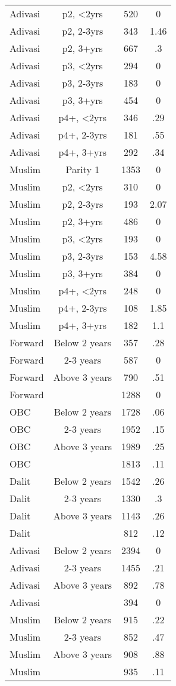 \begin{tabular}{lccc}
Adivasi&p2, <2yrs&520&0\\
Adivasi&p2, 2-3yrs&343&1.46\\
Adivasi&p2, 3+yrs&667&.3\\
Adivasi&p3, <2yrs&294&0\\
Adivasi&p3, 2-3yrs&183&0\\
Adivasi&p3, 3+yrs&454&0\\
Adivasi&p4+, <2yrs&346&.29\\
Adivasi&p4+, 2-3yrs&181&.55\\
Adivasi&p4+, 3+yrs&292&.34\\
Muslim&Parity 1&1353&0\\
Muslim&p2, <2yrs&310&0\\
Muslim&p2, 2-3yrs&193&2.07\\
Muslim&p2, 3+yrs&486&0\\
Muslim&p3, <2yrs&193&0\\
Muslim&p3, 2-3yrs&153&4.58\\
Muslim&p3, 3+yrs&384&0\\
Muslim&p4+, <2yrs&248&0\\
Muslim&p4+, 2-3yrs&108&1.85\\
Muslim&p4+, 3+yrs&182&1.1\\
Forward&Below 2 years&357&.28\\
Forward&2-3 years&587&0\\
Forward&Above 3 years&790&.51\\
Forward&&1288&0\\
OBC&Below 2 years&1728&.06\\
OBC&2-3 years&1952&.15\\
OBC&Above 3 years&1989&.25\\
OBC&&1813&.11\\
Dalit&Below 2 years&1542&.26\\
Dalit&2-3 years&1330&.3\\
Dalit&Above 3 years&1143&.26\\
Dalit&&812&.12\\
Adivasi&Below 2 years&2394&0\\
Adivasi&2-3 years&1455&.21\\
Adivasi&Above 3 years&892&.78\\
Adivasi&&394&0\\
Muslim&Below 2 years&915&.22\\
Muslim&2-3 years&852&.47\\
Muslim&Above 3 years&908&.88\\
Muslim&&935&.11\\
\bottomrule
\end{tabular}
